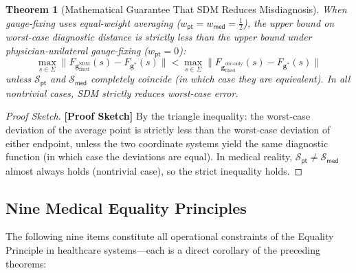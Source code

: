 \documentclass[12pt,a4paper]{article}
\newtheorem{theorem}{Theorem}[section]
\theoremstyle{remark}
\newcommand{\med}{\textsf{med}}
\newcommand{\pt}{\textsf{pt}}
\newcommand{\rigorSketch}{\textnormal{\textbf{[Proof Sketch]}}}
\begin{document}
\begin{theorem}[Mathematical Guarantee That SDM Reduces Misdiagnosis]\label{thm:sdm}
When gauge-fixing uses equal-weight averaging ($w_{\pt} = w_{\med} = \frac{1}{2}$), the upper bound on worst-case diagnostic distance is strictly less than the upper bound under physician-unilateral gauge-fixing ($w_{\pt} = 0$):
\begin{equation}
    \max_{s \in \Sigma} \|F_{\mathbf{g}_{\text{fixed}}^{\text{SDM}}}(s) - F_{\mathbf{g}^{*}}(s)\| < \max_{s \in \Sigma} \|F_{\mathbf{g}_{\text{fixed}}^{\text{doc-only}}}(s) - F_{\mathbf{g}^{*}}(s)\|
\end{equation}
unless $\mathcal{S}_{\pt}$ and $\mathcal{S}_{\med}$ completely coincide (in which case they are equivalent). In all nontrivial cases, SDM strictly reduces worst-case error.
\end{theorem}

\begin{proof}[Proof Sketch]\rigorSketch
By the triangle inequality: the worst-case deviation of the average point is strictly less than the worst-case deviation of either endpoint, unless the two coordinate systems yield the same diagnostic function (in which case the deviations are equal). In medical reality, $\mathcal{S}_{\pt} \neq \mathcal{S}_{\med}$ almost always holds (nontrivial case), so the strict inequality holds.
\end{proof}

\subsection{Nine Medical Equality Principles}

The following nine items constitute all operational constraints of the Equality Principle in healthcare systems---each is a direct corollary of the preceding theorems:
\end{document}
